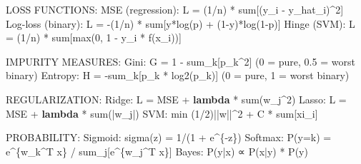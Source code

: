 \documentclass[11pt]{article}
\newenvironment{Shaded}{\begin{snugshade}}{\end{snugshade}}
\newcommand{\BuiltInTok}[1]{\textcolor[rgb]{0.50,0.55,0.55}{#1}}
\newcommand{\DecValTok}[1]{\textcolor[rgb]{0.96,0.45,0.00}{#1}}
\newcommand{\FloatTok}[1]{\textcolor[rgb]{0.96,0.45,0.00}{#1}}
\newcommand{\KeywordTok}[1]{\textcolor[rgb]{0.81,0.81,0.76}{\textbf{#1}}}
\newcommand{\NormalTok}[1]{\textcolor[rgb]{0.81,0.81,0.76}{#1}}
\newcommand{\OperatorTok}[1]{\textcolor[rgb]{0.81,0.81,0.76}{#1}}
\begin{document}

\begin{Shaded}
\begin{Highlighting}[]
\NormalTok{LOSS FUNCTIONS:}
\NormalTok{MSE (regression):     L }\OperatorTok{=}\NormalTok{ (}\DecValTok{1}\OperatorTok{/}\NormalTok{n) }\OperatorTok{*} \BuiltInTok{sum}\NormalTok{[(y\_i }\OperatorTok{{-}}\NormalTok{ y\_hat\_i)}\OperatorTok{\^{}}\DecValTok{2}\NormalTok{]}
\NormalTok{Log}\OperatorTok{{-}}\NormalTok{loss (binary):    L }\OperatorTok{=} \OperatorTok{{-}}\NormalTok{(}\DecValTok{1}\OperatorTok{/}\NormalTok{n) }\OperatorTok{*} \BuiltInTok{sum}\NormalTok{[y}\OperatorTok{*}\NormalTok{log(p) }\OperatorTok{+}\NormalTok{ (}\DecValTok{1}\OperatorTok{{-}}\NormalTok{y)}\OperatorTok{*}\NormalTok{log(}\DecValTok{1}\OperatorTok{{-}}\NormalTok{p)]}
\NormalTok{Hinge (SVM):          L }\OperatorTok{=}\NormalTok{ (}\DecValTok{1}\OperatorTok{/}\NormalTok{n) }\OperatorTok{*} \BuiltInTok{sum}\NormalTok{[}\BuiltInTok{max}\NormalTok{(}\DecValTok{0}\NormalTok{, }\DecValTok{1} \OperatorTok{{-}}\NormalTok{ y\_i }\OperatorTok{*}\NormalTok{ f(x\_i))]}

\NormalTok{IMPURITY MEASURES:}
\NormalTok{Gini:     G }\OperatorTok{=} \DecValTok{1} \OperatorTok{{-}}\NormalTok{ sum\_k[p\_k}\OperatorTok{\^{}}\DecValTok{2}\NormalTok{]          (}\DecValTok{0} \OperatorTok{=}\NormalTok{ pure, }\FloatTok{0.5} \OperatorTok{=}\NormalTok{ worst binary)}
\NormalTok{Entropy:  H }\OperatorTok{=} \OperatorTok{{-}}\NormalTok{sum\_k[p\_k }\OperatorTok{*}\NormalTok{ log2(p\_k)]   (}\DecValTok{0} \OperatorTok{=}\NormalTok{ pure, }\DecValTok{1} \OperatorTok{=}\NormalTok{ worst binary)}

\NormalTok{REGULARIZATION:}
\NormalTok{Ridge: L }\OperatorTok{=}\NormalTok{ MSE }\OperatorTok{+} \KeywordTok{lambda} \OperatorTok{*} \BuiltInTok{sum}\NormalTok{(w\_j}\OperatorTok{\^{}}\DecValTok{2}\NormalTok{)}
\NormalTok{Lasso: L }\OperatorTok{=}\NormalTok{ MSE }\OperatorTok{+} \KeywordTok{lambda} \OperatorTok{*} \BuiltInTok{sum}\NormalTok{(}\OperatorTok{|}\NormalTok{w\_j}\OperatorTok{|}\NormalTok{)}
\NormalTok{SVM:   }\BuiltInTok{min}\NormalTok{ (}\DecValTok{1}\OperatorTok{/}\DecValTok{2}\NormalTok{)}\OperatorTok{||}\NormalTok{w}\OperatorTok{||\^{}}\DecValTok{2} \OperatorTok{+}\NormalTok{ C }\OperatorTok{*} \BuiltInTok{sum}\NormalTok{[xi\_i]}

\NormalTok{PROBABILITY:}
\NormalTok{Sigmoid:  sigma(z) }\OperatorTok{=} \DecValTok{1}\OperatorTok{/}\NormalTok{(}\DecValTok{1} \OperatorTok{+}\NormalTok{ e}\OperatorTok{\^{}}\NormalTok{\{}\OperatorTok{{-}}\NormalTok{z\})}
\NormalTok{Softmax:  P(y}\OperatorTok{=}\NormalTok{k) }\OperatorTok{=}\NormalTok{ e}\OperatorTok{\^{}}\NormalTok{\{w\_k}\OperatorTok{\^{}}\NormalTok{T x\} }\OperatorTok{/}\NormalTok{ sum\_j[e}\OperatorTok{\^{}}\NormalTok{\{w\_j}\OperatorTok{\^{}}\NormalTok{T x\}]}
\NormalTok{Bayes:    P(y}\OperatorTok{|}\NormalTok{x) ∝ P(x}\OperatorTok{|}\NormalTok{y) }\OperatorTok{*}\NormalTok{ P(y)}


\end{Highlighting}
\end{Shaded}
\end{document}
